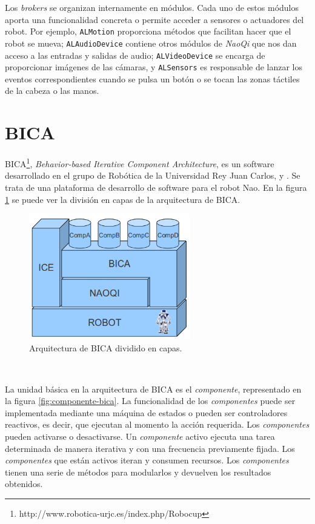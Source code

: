 Los \textit{brokers} se organizan internamente en módulos. Cada uno de estos módulos aporta una funcionalidad concreta o permite acceder a sensores o actuadores del robot. Por ejemplo, \texttt{ALMotion} proporciona métodos que facilitan hacer que el robot se mueva; \texttt{ALAudioDevice} contiene otros módulos de \textit{NaoQi} que nos dan acceso a las entradas y salidas de audio; \texttt{ALVideoDevice} se encarga de proporcionar imágenes de las cámaras, y \texttt{ALSensors} es responsable de lanzar los eventos correspondientes cuando se pulsa un botón o se tocan las zonas táctiles de la cabeza o las manos.

\section{BICA}
\label{sec:bica}

BICA\footnote{http://www.robotica-urjc.es/index.php/Robocup}, \textit{Behavior-based Iterative Component Architecture}, es un software desarrollado en el grupo de Robótica de la Universidad Rey Juan Carlos, \cite{BICA2010} y \cite{BICA2013}. Se trata de una plataforma de desarrollo de software para el robot Nao. En la figura \ref{fig:bloques-bica} se puede ver la división en capas de la arquitectura de BICA.

\begin{figure} [hbtp]
  \begin{center}
    \includegraphics[width=7cm]{img/cap3/bloques-bica}
  \end{center}
  \caption{Arquitectura de BICA dividido en capas.}
  \label{fig:bloques-bica}
\end{figure}\

La unidad básica en la arquitectura de BICA es el \textit{componente}, representado en la figura \ref{fig:componente-bica}. La funcionalidad de los \textit{componentes} puede ser implementada mediante una máquina de estados o pueden ser controladores reactivos, es decir, que ejecutan al momento la acción requerida. Los \textit{componentes} pueden activarse o desactivarse. Un \textit{componente} activo ejecuta una tarea determinada de manera iterativa y con una frecuencia previamente fijada. Los \textit{componentes} que están activos iteran y consumen recursos. Los \textit{componentes} tienen una serie de métodos para modularlos y devuelven los resultados obtenidos.\\

